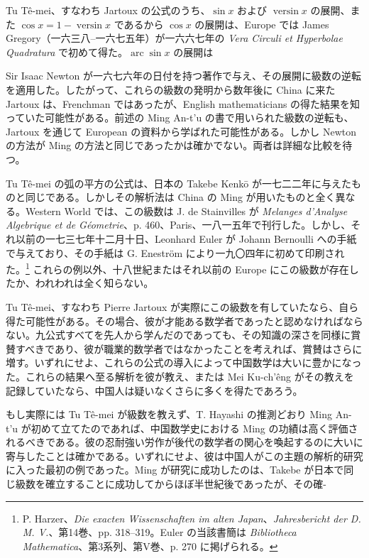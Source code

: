 \documentclass[11pt]{article}
\newcommand{\scanpage}[2]{\clearpage\setcounter{footnote}{0}\noindent{\footnotesize\color{gray}PDF #1 頁 · #2}\par\medskip}
\newcommand{\scanfooter}{}
\newcommand{\arcop}{\mathop{\mathrm{arc}}}
\newcommand{\versin}{\mathop{\mathrm{versin}}}
\begin{document}
Tu Tê-mei、すなわち Jartoux の公式のうち、$\sin x$ および $\versin x$ の展開、また $\cos x=1-\versin x$ であるから $\cos x$ の展開は、Europe では James Gregory（一六三八--一六七五年）が一六六七年の \emph{Vera Circuli et Hyperbolae Quadratura} で初めて得た。$\arcop\sin x$ の展開は
\scanfooter

\scanpage{0163}{第21章、印刷頁149}
Sir Isaac Newton が一六七六年の日付を持つ著作で与え、その展開に級数の逆転を適用した。したがって、これらの級数の発明から数年後に China に来た Jartoux は、Frenchman ではあったが、English mathematicians の得た結果を知っていた可能性がある。前述の Ming An-t'u の書で用いられた級数の逆転も、Jartoux を通じて European の資料から学ばれた可能性がある。しかし Newton の方法が Ming の方法と同じであったかは確かでない。両者は詳細な比較を待つ。

Tu Tê-mei の弧の平方の公式は、日本の Takebe Kenkō が一七二二年に与えたものと同じである。しかしその解析法は China の Ming が用いたものと全く異なる。Western World では、この級数は J. de Stainvilles が \emph{Melanges d'Analyse Algebrique et de Géometrie}、p. 460、Paris、一八一五年で刊行した。しかし、それ以前の一七三七年十二月十日、Leonhard Euler が Johann Bernoulli への手紙で与えており、その手紙は G. Eneström により一九〇四年に初めて印刷された。\footnote{P. Harzer、\emph{Die exacten Wissenschaften im alten Japan}、\emph{Jahresbericht der D. M. V.}、第14巻、pp. 318--319。Euler の当該書簡は \emph{Bibliotheca Mathematica}、第3系列、第V巻、p. 270 に掲げられる。} これらの例以外、十八世紀またはそれ以前の Europe にこの級数が存在したか、われわれは全く知らない。

Tu Tê-mei、すなわち Pierre Jartoux が実際にこの級数を有していたなら、自ら得た可能性がある。その場合、彼が才能ある数学者であったと認めなければならない。九公式すべてを先人から学んだのであっても、その知識の深さを同様に賞賛すべきであり、彼が職業的数学者ではなかったことを考えれば、賞賛はさらに増す。いずれにせよ、これらの公式の導入によって中国数学は大いに豊かになった。これらの結果へ至る解析を彼が教え、または Mei Ku-ch'êng がその教えを記録していたなら、中国人は疑いなくさらに多くを得たであろう。

もし実際には Tu Tê-mei が級数を教えず、T. Hayashi の推測どおり Ming An-t'u が初めて立てたのであれば、中国数学史における Ming の功績は高く評価されるべきである。彼の忍耐強い労作が後代の数学者の関心を喚起するのに大いに寄与したことは確かである。いずれにせよ、彼は中国人がこの主題の解析的研究に入った最初の例であった。Ming が研究に成功したのは、Takebe が日本で同じ級数を確立することに成功してからほぼ半世紀後であったが、その確-
\scanfooter
\end{document}
